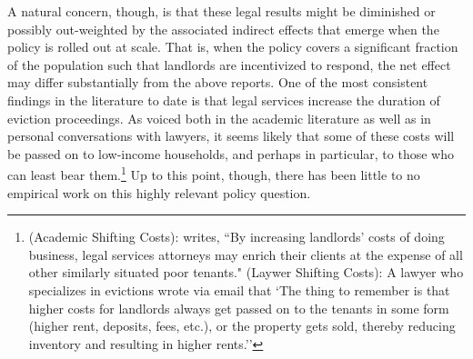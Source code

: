 \documentclass[a4paper,12pt]{article}
\begin{document}
A natural concern, though, is that these legal results might be diminished or possibly out-weighted by the associated indirect effects that emerge when the policy is rolled out at scale. That is, when the policy covers a significant fraction of the population such that landlords are incentivized to respond, the net effect may differ substantially from the above reports. One of the most consistent findings in the literature to date is that legal services increase the duration of eviction proceedings. As voiced both in the academic literature as well as in personal conversations with lawyers, it seems likely that some of these costs will be passed on to low-income households, and perhaps in particular, to those who can least bear them.\footnote{(Academic Shifting Costs): \cite{gunn1995eviction} writes, ``By increasing landlords' costs of doing business, legal services attorneys may enrich their clients at the expense of all other similarly situated poor tenants." (Laywer Shifting Costs):  A lawyer who specializes in evictions wrote via email that `The thing to remember is that higher costs for landlords always get passed on to the tenants in some form (higher rent, deposits, fees, etc.), or the property gets sold, thereby reducing inventory and resulting in higher rents.''} Up to this point, though, there has been little to no empirical work on this highly relevant policy question. \par 
\end{document}
